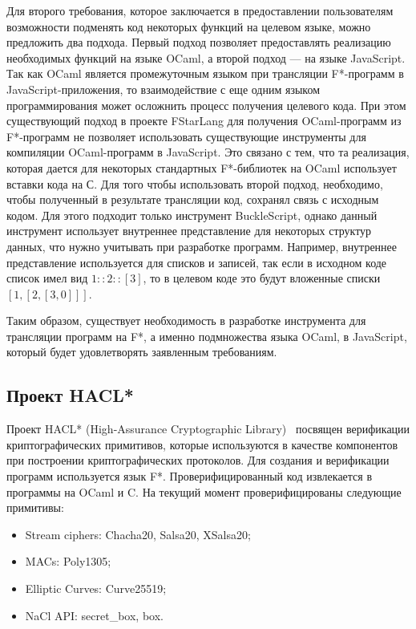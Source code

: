 \documentclass[12pt]{matmex-diploma}
\begin{document}
Для второго требования, которое заключается в предоставлении пользователям возможности подменять код некоторых функций на целевом языке, можно предложить два подхода. Первый подход позволяет предоставлять реализацию необходимых функций на языке OCaml, а второй подход --- на языке JavaScript. Так как OCaml является промежуточным языком при трансляции F*-программ в JavaScript-приложения, то взаимодействие с еще одним языком программирования может осложнить процесс получения целевого кода. При этом существующий подход в проекте FStarLang для получения OCaml-программ из F*-программ не позволяет использовать существующие инструменты для компиляции OCaml-программ в JavaScript. Это связано с тем, что та реализация, которая дается для некоторых стандартных F*-библиотек на OCaml использует вставки кода на С. Для того чтобы использовать второй подход, необходимо, чтобы полученный в результате трансляции код, сохранял связь с исходным кодом. Для этого подходит только инструмент BuckleScript, однако данный инструмент использует внутреннее представление для некоторых структур данных, что нужно учитывать при разработке программ. Например, внутреннее представление используется для списков и записей, так если в исходном коде список имел вид $1::2::[3]$, то в целевом коде это будут вложенные списки $[ 1, [ 2, [ 3, 0 ] ] ]$. 

Таким образом, существует необходимость в разработке инструмента для трансляции программ на F*, а именно подмножества языка OCaml, в JavaScript, который будет удовлетворять заявленным требованиям.

\subsection{Проект HACL*}

Проект HACL* (High-Assurance Cryptographic Library)~\cite{hacl_star} посвящен верификации криптографических примитивов, которые используются в качестве компонентов при построении криптографических протоколов. Для создания и верификации программ используется язык F*. Проверифицированный код извлекается в программы на OCaml и C. На текущий момент проверифицированы следующие примитивы: 

\begin{itemize}
    \item Stream ciphers: Chacha20, Salsa20, XSalsa20;
    \item MACs: Poly1305;
    \item Elliptic Curves: Curve25519;
    \item NaCl API: secret\_box, box.
\end{itemize}
\end{document}
